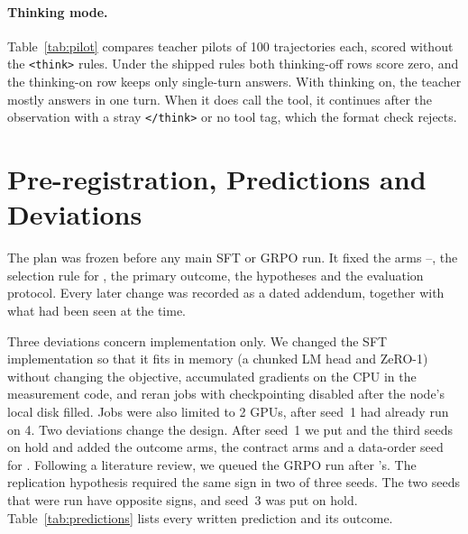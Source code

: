 \paragraph{Thinking mode.}
Table~\ref{tab:pilot} compares teacher pilots of 100 trajectories each, scored without the \texttt{<think>} rules. Under the shipped rules both thinking-off rows score zero, and the thinking-on row keeps only single-turn answers. With thinking on, the teacher mostly answers in one turn. When it does call the tool, it continues after the observation with a stray \texttt{</think>} or no tool tag, which the format check rejects.

\begin{table}[t]
\centering\small
{}
\caption{Teacher pilots (Qwen3-32B). Accuracy is scored without the \texttt{<think>} rules; multi-turn counts are among well-formed trajectories.}
\label{tab:pilot}
\end{table}

\section{Pre-registration, Predictions and Deviations}
\label{app:prereg}

The plan was frozen before any main SFT or GRPO run. It fixed the arms \armA{}--\armD{}, the selection rule for \armC{}, the primary outcome, the hypotheses and the evaluation protocol. Every later change was recorded as a dated addendum, together with what had been seen at the time.

Three deviations concern implementation only. We changed the SFT implementation so that it fits in memory (a chunked LM head and ZeRO-1) without changing the objective, accumulated gradients on the CPU in the measurement code, and reran jobs with checkpointing disabled after the node's local disk filled. Jobs were also limited to 2 GPUs, after \armA{} seed~1 had already run on 4. Two deviations change the design. After seed~1 we put \armD{} and the third seeds on hold and added the outcome arms, the contract arms and a data-order seed for \armA{}. Following a literature review, we queued the \armF{} GRPO run after \armG's. The replication hypothesis required the same sign in two of three seeds. The two seeds that were run have opposite signs, and seed~3 was put on hold. Table~\ref{tab:predictions} lists every written prediction and its outcome.

